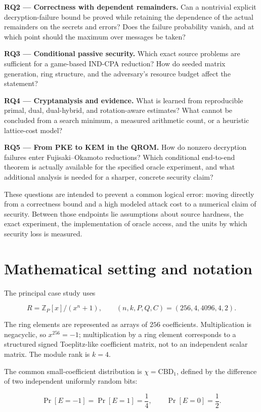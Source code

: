 \documentclass[
  11pt,
  a4paper,
  oneside]{report}
\begin{document}
\textbf{RQ2 --- Correctness with dependent remainders.} Can a nontrivial
explicit decryption-failure bound be proved while retaining the
dependence of the actual remainders on the secrets and errors? Does the
failure probability vanish, and at which point should the maximum over
messages be taken?

\textbf{RQ3 --- Conditional passive security.} Which exact source
problems are sufficient for a game-based IND-CPA reduction? How do
seeded matrix generation, ring structure, and the adversary's resource
budget affect the statement?

\textbf{RQ4 --- Cryptanalysis and evidence.} What is learned from
reproducible primal, dual, dual-hybrid, and rotation-aware estimates?
What cannot be concluded from a search minimum, a measured arithmetic
count, or a heuristic lattice-cost model?

\textbf{RQ5 --- From PKE to KEM in the QROM.} How do nonzero decryption
failures enter Fujisaki--Okamoto reductions? Which conditional
end-to-end theorem is actually available for the specified oracle
experiment, and what additional analysis is needed for a sharper,
concrete security claim?

These questions are intended to prevent a common logical error: moving
directly from a correctness bound and a high modeled attack cost to a
numerical claim of security. Between those endpoints lie assumptions
about source hardness, the exact experiment, the implementation of
oracle access, and the units by which security loss is measured.

\section{Mathematical setting and
notation}\label{mathematical-setting-and-notation}

The principal case study uses

\[
R=\mathbb Z_P[x]/(x^n+1),\qquad
(n,k,P,Q,C)=(256,4,4096,4,2).
\]

The ring elements are represented as arrays of \(256\) coefficients.
Multiplication is negacyclic, so \(x^{256}=-1\); multiplication by a
ring element corresponds to a structured signed Toeplitz-like
coefficient matrix, not to an independent scalar matrix. The module rank
is \(k=4\).

The common small-coefficient distribution is \(\chi=\mathrm{CBD}_1\),
defined by the difference of two independent uniformly random bits:

\[
\Pr[E=-1]=\Pr[E=1]=\frac14,
\qquad \Pr[E=0]=\frac12.
\]
\end{document}
